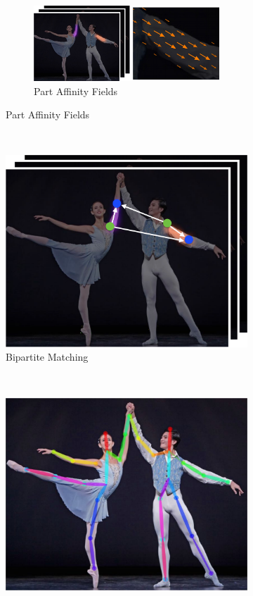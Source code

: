 \begin{figure}[h]
\begin{subfigure}[b]{0.24\textwidth}
    \begin{subfigure}{1\textwidth}
      \includegraphics[width=1\linewidth]{img/openpose_pipeline_c}
      \caption{Part Affinity Fields}
      \label{fig:oppC}
    \end{subfigure}
  \end{subfigure}%
  ~
  \begin{subfigure}[t]{0.24\textwidth}
    \includegraphics[width=1\linewidth]{img/openpose_pipeline_d}
    \caption{Bipartite Matching}
    \label{fig:oppD}
  \end{subfigure}%
  ~
  \begin{subfigure}[t]{0.24\textwidth}
    \includegraphics[width=1\linewidth]{img/openpose_pipeline_e}

\end{subfigure}
\end{figure}
